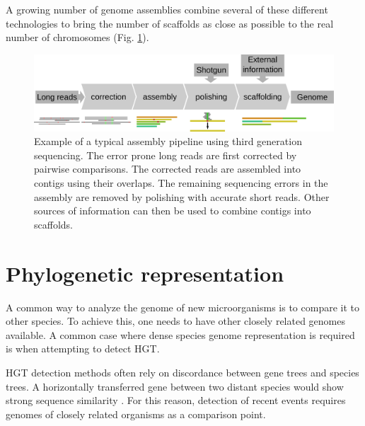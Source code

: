 A growing number of genome assemblies combine several of these different technologies to bring the number of scaffolds as close as possible to the real number of chromosomes (Fig. \ref{fig:01-03:assembly}).

\begin{figure}[htb]
    \includegraphics[width=\textwidth]{Parts/Part01/gfx/assembly_pipeline.pdf}
    \caption{Example of a typical assembly pipeline using third generation sequencing. The error prone long reads are first corrected by pairwise comparisons. The corrected reads are assembled into contigs using their overlaps. The remaining sequencing errors in the assembly are removed by polishing with accurate short reads. Other sources of information can then be used to combine contigs into scaffolds.}
    \label{fig:01-03:assembly}
\end{figure}

\section{Phylogenetic representation}

A common way to analyze the genome of new microorganisms is to compare it to other species. To achieve this, one needs to have other closely related genomes available. A common case where dense species genome representation is required is when attempting to detect \acrshort{HGT}.

\acrshort{HGT} detection methods often rely on discordance between gene trees and species trees. A horizontally transferred gene between two distant species would show strong sequence similarity \cite{ravenhallInferringHorizontalGene2015}. For this reason, detection of recent events requires genomes of closely related organisms as a comparison point.

